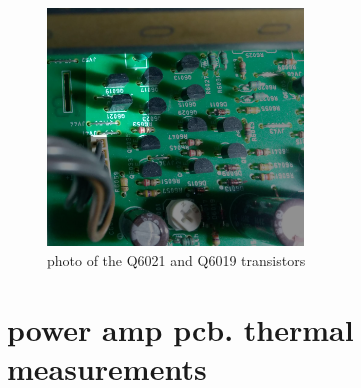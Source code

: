 \documentclass[a4paper,twoside,notitlepage]{article}
\begin{document}
\begin{figure}[hptb!]
\centering
 \includegraphics[width=6.8cm, keepaspectratio=true]{img_report/main_pcb_l.png}
 \caption{photo of the Q6021 and Q6019 transistors}
\end{figure}

\clearpage
\section{power amp pcb. thermal measurements} \label{sec:pwr-thermal-measurements}

\end{document}
